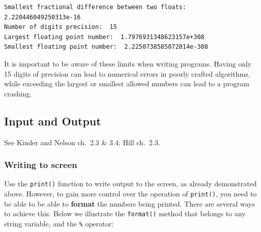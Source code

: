 \documentclass[10pt]{article}
\begin{document}
    \begin{Verbatim}[commandchars=\\\{\}]
Smallest fractional difference between two floats:  2.220446049250313e-16
Number of digits precision:  15
Largest floating point number:  1.7976931348623157e+308
Smallest floating point number:  2.2250738585072014e-308
    \end{Verbatim}

    It is important to be aware of these limits when writing programs.
Having only 15 digits of precision can lead to numerical errors in
poorly crafted algorithms, while exceeding the largest or smallest
allowed numbers can lead to a program crashing.

\hypertarget{input-and-output}{%
\subsection{Input and Output}\label{input-and-output}}

See Kinder and Nelson ch.~2.3 \& 3.4; Hill ch.~2.3. 
\subsubsection{Writing
to screen} Use the \texttt{print()} function to write output to the
screen, as already demonstrated above. However, to gain more control
over the operation of \texttt{print()}, you need to be able to be able
to \textbf{format} the numbers being printed. There are several ways to
achieve this. Below we illustrate the \texttt{format()} method that
belongs to any string variable, and the \texttt{\%} operator:
\end{document}
